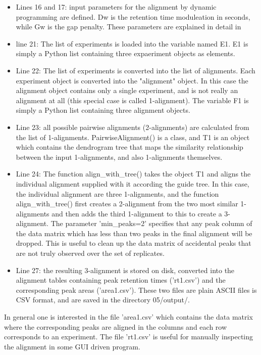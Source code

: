 \begin{itemize}
\item Lines 16 and 17: input parameters for the alignment by dynamic
programming are defined. Dw is the retention time moduleation in seconds,
while Gw is the gap penalty.  These parameters are explained in detail
in \cite{Robinson07}
\item line 21: The list of experiments is loaded into the variable
named E1.  E1 is simply a Python list containing three expaeriment
objects as elements.
\item Line 22: The list of experiments is converted into the list of
alignments. Each experiment object is converted into the "alignment"
object. In this case the alignment object contains only a single
experiment, and is not really an alignment at all (this special case
is called 1-alignment). The variable F1 is simply a Python list
containing three alignment objects.
\item Line 23: all possible pairwise alignments (2-alignments) are
calculated from the list of 1-alignments. PairwiseAlignment() is
a class, and T1 is an object which contains the dendrogram tree that
maps the similarity relationship between the input 1-alignments,
and also 1-alignments themselves. 
\item Line 24: The function align\_with\_tree() takes the object
T1 and aligns the individual alignment supplied with it according
the guide tree.  In this case, the individual alignment are
three 1-alignments, and the function align\_with\_tree() first
creates a 2-alignment from the two most similar 1-alignments
and then adds the third 1-alignment to this to create a
3-alignment. The parameter 'min\_peaks=2' specifies that any peak
column of the data matrix which has less than two peaks in the final
alignment will be dropped.  This is useful to clean up the data
matrix of accidental peaks that are not truly observed over the
set of replicates. 
\item Line 27: the resulting 3-alignment is stored on disk, converted
into the alignment tables containing peak retention times ('rt1.csv')
and the corresponding peak areas ('area1.csv'). These two files are
plain ASCII files is CSV format, and are saved in the directory
05/output/.
\end{itemize}

\noindent
In general one is interested in the file 'area1.csv' which contains
the data matrix where the corresponding peaks are aligned in the
columns and each row corresponds to an experiment. The file 'rt1.csv'
is useful for manually inspecting the alignment in some GUI driven
program.

